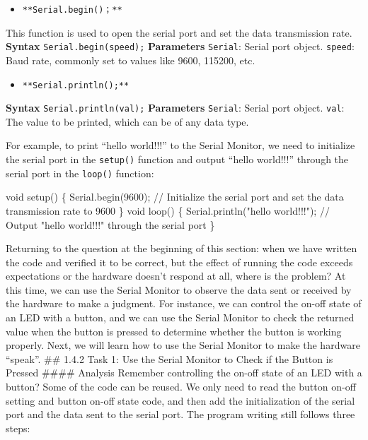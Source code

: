 \documentclass[
  letterpaper,
  DIV=11,
  numbers=noendperiod]{scrreprt}
\newenvironment{Shaded}{\begin{snugshade}}{\end{snugshade}}
\newcommand{\CommentTok}[1]{\textcolor[rgb]{0.37,0.37,0.37}{#1}}
\newcommand{\DataTypeTok}[1]{\textcolor[rgb]{0.68,0.00,0.00}{#1}}
\newcommand{\DecValTok}[1]{\textcolor[rgb]{0.68,0.00,0.00}{#1}}
\newcommand{\NormalTok}[1]{\textcolor[rgb]{0.00,0.23,0.31}{#1}}
\newcommand{\OperatorTok}[1]{\textcolor[rgb]{0.37,0.37,0.37}{#1}}
\newcommand{\StringTok}[1]{\textcolor[rgb]{0.13,0.47,0.30}{#1}}
\providecommand{\tightlist}{%
  \setlength{\itemsep}{0pt}\setlength{\parskip}{0pt}}\usepackage{longtable,booktabs,array}
\begin{document}
\begin{itemize}
\tightlist
\item
  \texttt{**Serial.begin()；**}
\end{itemize}

This function is used to open the serial port and set the data
transmission rate. \textbf{Syntax} \texttt{Serial.begin(speed);}
\textbf{Parameters} \texttt{Serial}: Serial port object. \texttt{speed}:
Baud rate, commonly set to values like 9600, 115200, etc.

\begin{itemize}
\tightlist
\item
  \texttt{**Serial.println();**}
\end{itemize}

\textbf{Syntax} \texttt{Serial.println(val);} \textbf{Parameters}
\texttt{Serial}: Serial port object. \texttt{val}: The value to be
printed, which can be of any data type.

For example, to print ``hello world!!!'' to the Serial Monitor, we need
to initialize the serial port in the \texttt{setup()} function and
output ``hello world!!!'' through the serial port in the \texttt{loop()}
function:

\begin{Shaded}
\begin{Highlighting}[]
\DataTypeTok{void}\NormalTok{ setup}\OperatorTok{()} \OperatorTok{\{}
\NormalTok{    Serial}\OperatorTok{.}\NormalTok{begin}\OperatorTok{(}\DecValTok{9600}\OperatorTok{);} \CommentTok{// Initialize the serial port and set the data transmission rate to 9600}
\OperatorTok{\}}
\DataTypeTok{void}\NormalTok{ loop}\OperatorTok{()} \OperatorTok{\{}
\NormalTok{    Serial}\OperatorTok{.}\NormalTok{println}\OperatorTok{(}\StringTok{"hello world!!!"}\OperatorTok{);} \CommentTok{// Output "hello world!!!" through the serial port}
\OperatorTok{\}}
\end{Highlighting}
\end{Shaded}

Returning to the question at the beginning of this section: when we have
written the code and verified it to be correct, but the effect of
running the code exceeds expectations or the hardware doesn't respond at
all, where is the problem? At this time, we can use the Serial Monitor
to observe the data sent or received by the hardware to make a judgment.
For instance, we can control the on-off state of an LED with a button,
and we can use the Serial Monitor to check the returned value when the
button is pressed to determine whether the button is working properly.
Next, we will learn how to use the Serial Monitor to make the hardware
``speak''. \#\# 1.4.2 Task 1: Use the Serial Monitor to Check if the
Button is Pressed \#\#\#\# Analysis Remember controlling the on-off
state of an LED with a button? Some of the code can be reused. We only
need to read the button on-off setting and button on-off state code, and
then add the initialization of the serial port and the data sent to the
serial port. The program writing still follows three steps:
\end{document}
